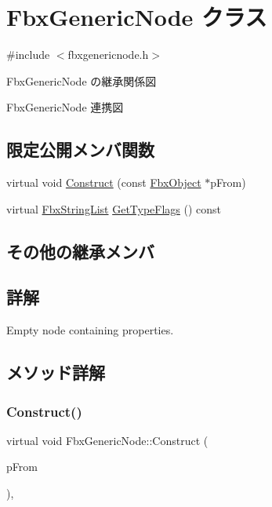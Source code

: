 \hypertarget{class_fbx_generic_node}{}\section{Fbx\+Generic\+Node クラス}
\label{class_fbx_generic_node}


{\ttfamily \#include $<$fbxgenericnode.\+h$>$}



Fbx\+Generic\+Node の継承関係図


Fbx\+Generic\+Node 連携図
\subsection*{限定公開メンバ関数}
\begin{DoxyCompactItemize}
\item 
virtual void \hyperlink{class_fbx_generic_node_a63ff7b8adb2ddc1803f74b9afce50fc2}{Construct} (const \hyperlink{class_fbx_object}{Fbx\+Object} $\ast$p\+From)
\item 
virtual \hyperlink{class_fbx_string_list}{Fbx\+String\+List} \hyperlink{class_fbx_generic_node_a348566f1d9605e11b70a36cda95c9afb}{Get\+Type\+Flags} () const
\end{DoxyCompactItemize}
\subsection*{その他の継承メンバ}


\subsection{詳解}
Empty node containing properties. 

\subsection{メソッド詳解}
\mbox{\label{class_fbx_generic_node_a63ff7b8adb2ddc1803f74b9afce50fc2}} 
\subsubsection{\texorpdfstring{Construct()}{Construct()}}
{\footnotesize\ttfamily virtual void Fbx\+Generic\+Node\+::\+Construct (\begin{DoxyParamCaption}\item[{const \hyperlink{class_fbx_object}{Fbx\+Object} $\ast$}]{p\+From }\end{DoxyParamCaption})\hspace{0.3cm}{\ttfamily [protected]}, {\ttfamily [virtual]}}


